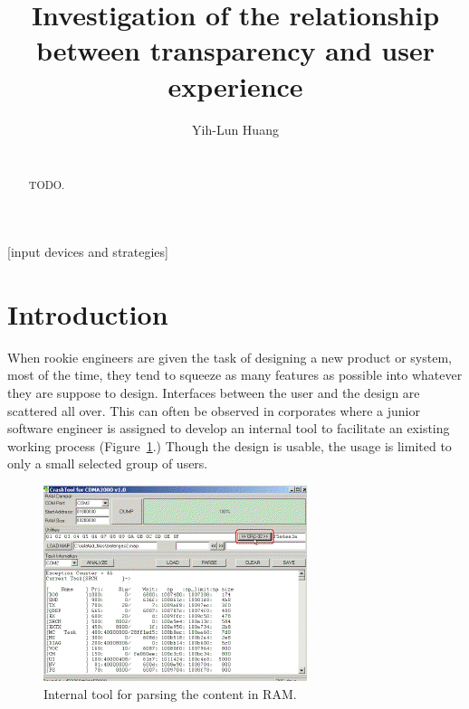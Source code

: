 \documentclass{acm_proc_article-sp}
\begin{document}
\title{Investigation of the relationship between transparency and user
  experience}

\author{
\alignauthor Yih-Lun Huang\\
\\
}

\maketitle
\begin{abstract}
TODO.
\end{abstract}

[input devices and strategies]



\section{Introduction}
When rookie engineers are given the task of designing a new product or
system, most of the time, they tend to squeeze as many features as
possible into whatever they are suppose to design. Interfaces between
the user and the design are scattered all over. This can often be
observed in corporates where a junior software engineer is assigned to
develop an internal tool to facilitate an existing working process
(Figure~\ref{fig:featureful}.) Though the design is usable, the usage
is limited to only a small selected group of users.

\begin{figure}[!t]
\centering
\includegraphics[width=.7\columnwidth]{featureful}
\caption{Internal tool for parsing the content in RAM.}
\label{fig:featureful}
\end{figure}
\end{document}
